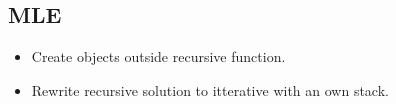 \documentclass[8pt,a4paper,landscape,oneside]{amsart}
\begin{document}
\begin{multicols*}{3}
    \subsection{MLE}
        \begin{itemize}
        \item Create objects outside recursive function.
        \item Rewrite recursive solution to itterative with an own stack.
        \end{itemize}



\end{multicols*}
\end{document}
